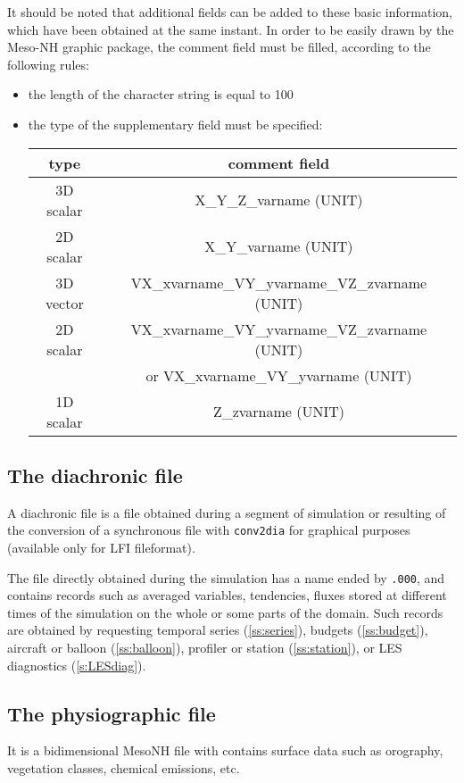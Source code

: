 It should be noted that additional fields can be added to these basic
information, which have been obtained at the same instant. 
 In order to be easily drawn by the Meso-NH graphic package, the
comment field must be filled, according to the following rules:
\begin{itemize}
\item 
the length of the character string is equal to 100
\item 
the type of the supplementary field must be specified:

\begin{tabular} {|| c |c|| }
\hline
\hline
type & comment field \\
\hline
3D scalar & X\_Y\_Z\_varname  (UNIT) \\
\hline
2D scalar & X\_Y\_varname  (UNIT) \\
\hline
3D vector & VX\_xvarname\_VY\_yvarname\_VZ\_zvarname  (UNIT) \\
\hline
2D scalar & VX\_xvarname\_VY\_yvarname\_VZ\_zvarname  (UNIT) \\
          & or  VX\_xvarname\_VY\_yvarname       (UNIT) \\
\hline
1D scalar & Z\_zvarname  (UNIT) \\
\hline
\hline
\end{tabular}
\end{itemize}

\subsection{The diachronic file}
A diachronic file is a file obtained during a segment of simulation or resulting of the
conversion of a synchronous file with {\tt conv2dia} for graphical purposes (available only for LFI fileformat).

The file directly obtained during the simulation has a name ended by {\tt .000},
and contains records such as averaged variables, tendencies, fluxes stored
at different times of the simulation on the whole or some parts of the domain.
Such records are obtained by requesting temporal series (\ref{ss:series}),
budgets (\ref{ss:budget}), aircraft or balloon (\ref{ss:balloon}), profiler
or station (\ref{ss:station}), or LES diagnostics (\ref{s:LESdiag}).

\subsection{The physiographic file}
It is a bidimensional MesoNH file with contains surface data such as orography,
vegetation classes, chemical emissions, etc.


